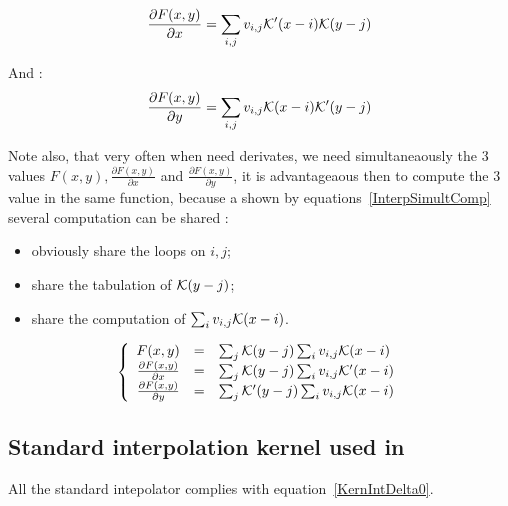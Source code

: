 \begin{equation}
    \frac{\partial F(x,y)}{\partial x} =  \sum_{i,j}  v_{i,j}  \mathcal K'(x-i) \mathcal K(y-j)   \label{Int2DerX}
\end{equation}

And  :
\begin{equation}
    \frac{\partial F(x,y)}{\partial y} =  \sum_{i,j}  v_{i,j}  \mathcal K(x-i) \mathcal K'(y-j)   \label{Int2DerY}
\end{equation}

Note also, that very often when need derivates, we need simultaneaously the $3$ values $F(x,y), \frac{\partial F(x,y)}{\partial x}$
and  $\frac{\partial F(x,y)}{\partial y}$, it is advantageaous then to compute the $3$ value in the same function, because
a shown by equations~\ref{InterpSimultComp} several computation can be shared :

\begin{itemize} 
    \item obviously share the loops on $i,j$;
    \item share the tabulation of $\mathcal K(y-j)$;
    \item share the computation of $\sum_{i}  v_{i,j}  \mathcal K(x-i)$.
\end{itemize} 

\begin{equation}
\left\{ \begin{array}{rcl}
     F(x,y)                                    &   \mbox{=} &  \sum_{j} \mathcal K(y-j)  \sum_{i}  v_{i,j}  \mathcal K(x-i)   \\
      \frac{\partial F(x,y)}{\partial x}       &   \mbox{=} &  \sum_{j} \mathcal K(y-j)  \sum_{i}  v_{i,j}  \mathcal K'(x-i)  \\
      \frac{\partial F(x,y)}{\partial y}       &   \mbox{=} &  \sum_{j} \mathcal K'(y-j) \sum_{i}  v_{i,j}  \mathcal K(x-i)  
\end{array}\right.
\label{InterpSimultComp}
\end{equation}

\subsection{Standard interpolation kernel used in \PPP}

All the standard intepolator complies with equation~\ref{KernIntDelta0}.

